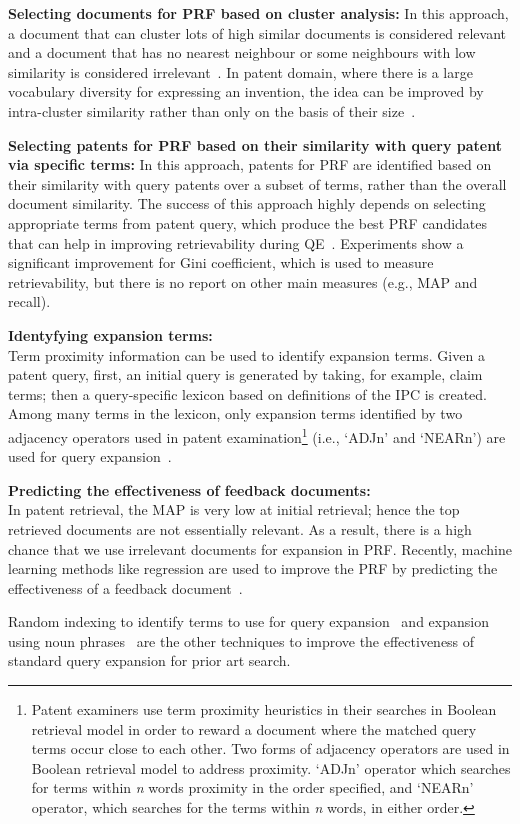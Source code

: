 \begin{list}{-}{}
\item \textbf{Selecting documents for PRF based on cluster analysis:} In this approach, a document that can cluster lots of high similar documents is considered relevant and a document that has no nearest neighbour or some neighbours with low similarity is considered irrelevant~\citep{lee2008cluster}. In patent domain, where there is a large vocabulary diversity for expressing an invention, the idea can be improved by intra-cluster similarity rather than only on the basis of their size~\citep{bashir2009improving}. 
\item \textbf{Selecting patents for PRF based on their similarity with query patent via specific terms:} In this approach, patents for PRF are identified based on their similarity with query patents over a subset of terms, rather than the overall document similarity. The success of this approach highly depends on selecting appropriate terms from patent query, which produce the best PRF candidates that can help in improving retrievability during QE~\citep{bashir2010improving}. Experiments show a significant improvement for Gini coefficient, which is used to measure retrievability, but there is no report on other main measures (e.g., MAP and recall).
\item \textbf{Identyfying expansion terms: } 
\ \\
Term proximity information can be used to identify expansion terms. Given a patent query, first, an initial query is generated by taking, for example, claim terms; then a query-specific lexicon based on definitions of the IPC is created.
Among many terms in the lexicon, only expansion terms identified by two adjacency operators used in patent examination\footnote{Patent examiners use term proximity heuristics in their
searches in Boolean retrieval model in order to reward a
document where the matched query terms occur close to
each other. Two forms of adjacency operators are used in
Boolean retrieval model to address proximity. `ADJn' operator which searches for terms within \textit{n} words proximity in
the order specified, and `NEARn' operator, which searches
for the terms within \textit{n} words, in either order.} (i.e., `ADJn' and `NEARn') are used for query expansion~\citep{mahdabi2013leveraging}.
\item \textbf{Predicting the effectiveness of feedback documents: } 
\ \\
In patent retrieval, the MAP is very low at initial retrieval; hence the top retrieved documents are not essentially relevant. 
As a result, there is a high
chance that we use irrelevant documents for expansion in PRF. Recently,
machine learning methods like regression are used to improve the PRF by predicting the effectiveness of a feedback document~\citep{mahdabi2012learning}.
\end{list}
Random indexing to identify terms to use for query expansion~\citep{sahlgren2002english} and expansion using noun phrases~\citep{mahdabi2012automatic} are the other techniques to improve the effectiveness of standard query expansion for prior art search. 
